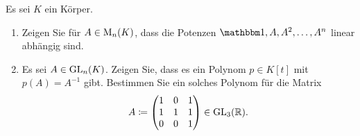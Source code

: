 \documentclass[a4paper, 10pt]{scrartcl}
\begin{document}
\begin{question}[subtitle = Cayley--Hamilton]
  Es sei $K$ ein Körper.
  \begin{enumerate}
    \item
      Zeigen Sie für $A \in \operatorname{M}_{n}(K)$, dass die Potenzen $\Id, A, A^2, \dotsc, A^n$ linear abhängig sind.
    \item
      Es sei $A \in \operatorname{GL}_{n}(K)$.
      Zeigen Sie, dass es ein Polynom $p \in K[t]$ mit $p(A) = A^{-1}$ gibt.
      Bestimmen Sie ein solches Polynom für die Matrix
      \[
                  A
        \coloneqq \begin{pmatrix}
                    1 & 0 & 1 \\
                    1 & 1 & 1 \\
                    0 & 0 & 1
                  \end{pmatrix}
        \in \operatorname{GL}_{3}(\mathbb{R}).
      \]
  \end{enumerate}
\end{question}
\end{document}
